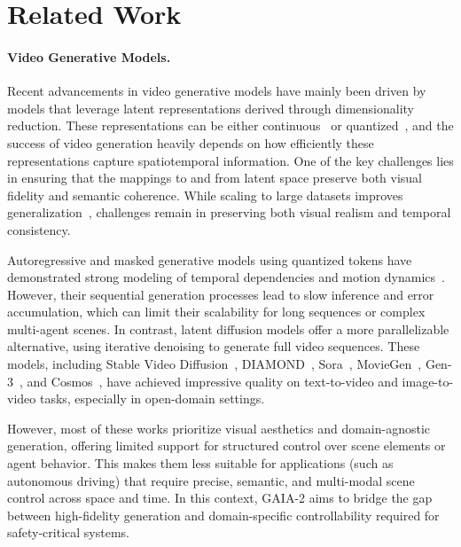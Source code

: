 

\section{Related Work}

\paragraph{Video Generative Models.}
Recent advancements in video generative models have mainly been driven by models that leverage latent representations derived through dimensionality reduction. These representations can be either continuous~\cite{kingma14,nvidia2024cosmos} or quantized~\cite{oord17,esser21}, and the success of video generation heavily depends on how efficiently these representations capture spatiotemporal information. One of the key challenges lies in ensuring that the mappings to and from latent space preserve both visual fidelity and semantic coherence. While scaling to large datasets improves generalization~\cite{agarwal2025cosmos}, challenges remain in preserving both visual realism and temporal consistency.

Autoregressive and masked generative models using quantized tokens have demonstrated strong modeling of temporal dependencies and motion dynamics~\cite{yan2021videogpt,moing21,ge2022long,seo22,hawthorne22,micheli2022transformers,teco22yan,villegas22phenaki,yu2023magvit}. However, their sequential generation processes lead to slow inference and error accumulation, which can limit their scalability for long sequences or complex multi-agent scenes. In contrast, latent diffusion models offer a more parallelizable alternative, using iterative denoising to generate full video sequences. These models, including Stable Video Diffusion~\cite{blattmann2023stable}, DIAMOND~\cite{alonso2024diffusionworldmodelingvisual}, Sora~\cite{openai2024sora}, MovieGen~\cite{polyak2024movie}, Gen-3~\cite{runway2024gen3}, and Cosmos~\cite{agarwal2025cosmos}, have achieved impressive quality on text-to-video and image-to-video tasks, especially in open-domain settings. 

However, most of these works prioritize visual aesthetics and domain-agnostic generation, offering limited support for structured control over scene elements or agent behavior. This makes them less suitable for applications (such as autonomous driving) that require precise, semantic, and multi-modal scene control across space and time. In this context, GAIA-2 aims to bridge the gap between high-fidelity generation and domain-specific controllability required for safety-critical systems.


